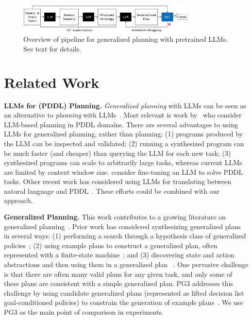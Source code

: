 \documentclass[letterpaper]{article} %
\begin{document}
\begin{figure}[t]
\centering
\includegraphics[width=0.8\textwidth]{teaser_figure.pdf}
\caption{Overview of pipeline for generalized planning with pretrained LLMs. See text for details.}
\label{fig:teaser}
\end{figure}

\section{Related Work}

\textbf{LLMs for (PDDL) Planning.}
\emph{Generalized planning} with LLMs can be seen as an alternative to \emph{planning} with LLMs~\cite{sharma2022skill,ahn2022can,huang2022language,raman2022planning,lin2022grounded}.
Most relevant is work by~\citet{valmeekam2022large,silver2022pddl} who consider LLM-based planning in PDDL domains.
There are several advantages to using LLMs for generalized planning, rather than planning: (1) programs produced by the LLM can be inspected and validated; (2) running a synthesized program can be much faster (and cheaper) than querying the LLM for each new task; (3) synthesized programs can scale to arbitrarily large tasks, whereas current LLMs are limited by context window size.
\citet{pallagani2022plansformer} consider fine-tuning an LLM to solve PDDL tasks.
Other recent work has considered using LLMs for translating between natural language and PDDL~\cite{collins2022structured,lin2023text2motion,xie2023translating,liu2023llm}.
These efforts could be combined with our approach.

\textbf{Generalized Planning.}
This work contributes to a growing literature on generalized planning~\cite{triangletables,jimenez2019review}.
Prior work has considered synthesizing generalized plans in several ways: (1) performing a search through a hypothesis class of generalized policies~\cite{levine2003learning,jimenez2015computing,segovia2018computing,segovia2021generalized}; (2) using example plans to construct a generalized plan, often represented with a finite-state machine~\cite{kplanner,Srivastava2011DirectedSF,winner2008dsplanner}; and (3) discovering state and action abstractions and then using them in a generalized plan ~\cite{genplan_representation}.
One pervasive challenge is that there are often many valid plans for any given task, and only some of these plans are consistent with a simple generalized plan.
PG3 addresses this challenge by using candidate generalized plans (represented as lifted decision list goal-conditioned policies) to constrain the generation of example plans~\cite{yang2022pg3}.
We use PG3 as the main point of comparison in experiments.
\end{document}
